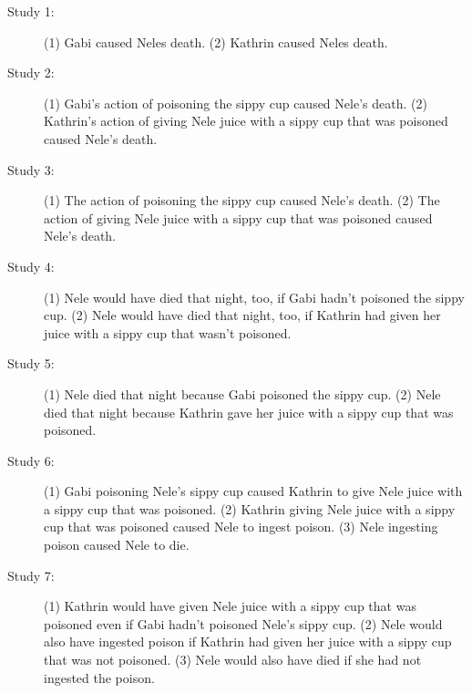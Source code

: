 \documentclass[egregdoesnotlikesansseriftitles,12pt]{scrartcl}
\begin{document}
\begin{description}
   \item [Study 1:] (1) Gabi caused Neles death. (2) Kathrin caused Neles death.%
   \item [Study 2:] (1) Gabi's action of poisoning the sippy cup caused Nele's death. (2) Kathrin's action of giving Nele juice with a sippy cup that was poisoned caused Nele's death.%
   \item [Study 3:] (1) The action of poisoning the sippy cup caused Nele's death. (2) The action of giving Nele juice with a sippy cup that was poisoned caused Nele's death.%
   \item [Study 4:] (1) Nele would have died that night, too, if Gabi hadn't poisoned the sippy cup. (2) Nele would have died that night, too, if Kathrin had given her juice with a sippy cup that wasn't poisoned.%
   \item [Study 5:] (1) Nele died that night because Gabi poisoned the sippy cup. (2) Nele died that night because Kathrin gave her juice with a sippy cup that was poisoned.%
   \item [Study 6:] (1) Gabi poisoning Nele's sippy cup caused Kathrin to give Nele juice with a sippy cup that was poisoned. (2) Kathrin giving Nele juice with a sippy cup that was poisoned caused Nele to ingest poison. (3) Nele ingesting poison caused Nele to die.%
   \item [Study 7:] (1) Kathrin would have given Nele juice with a sippy cup that was poisoned even if Gabi hadn't poisoned Nele's sippy cup. (2) Nele would also have ingested poison if Kathrin had given her juice with a sippy cup that was not poisoned. (3) Nele would also have died if she had not ingested the poison.%

\end{description}
\end{document}
